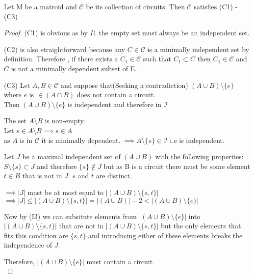 \documentclass[../main.tex]{subfiles}
\begin{document}
 \begin{thm}
 Let M be a matroid and $\mathcal{C}$ be its collection of circuits. Then $\mathcal{C}$ satisfies (C1) - (C3)
  \end{thm}
\begin{proof}
\noindent (C1) is obvious as by $I1$ the empty set must always be an independent set.
 
\noindent (C2) is also straightforward because any $ C \in \mathcal{C} $ is a minimally independent set by definition. Therefore , if there exists a $ C_1 \in \mathcal{C} $ such that $ C_1 \subset C $ then $ C_1 \in \mathcal{C} $ and $ C $ is not a minimally dependent subset of E. 
 
 \vspace{2mm}
 
 \noindent (C3) Let $ A, B \in \mathcal{C} $ and suppose that(Seeking a contradiction) $ (A \cup B) \setminus \{e\} $ where $ e $ is $ \in (A \cap B) $ does not contain a circuit.\\
 \noindent Then $ (A \cup B) \setminus \{e\} $ is independent and therefore in $\mathcal{I}$
 
 \vspace{2mm}
 
\noindent The set $ A \setminus B $ is non-empty.\\
 Let $ s \in A \setminus B    \implies s \in A$\\
 \noindent as $A$ is in $\mathcal{C}$ it is minimally dependent.
 \noindent $\implies A \setminus \{s\} \in \mathcal{I}$ i.e is independent.
 
 \vspace{2mm}
 
\noindent Let $J$ be a maximal independent set of $(A \cup B)$ with the following properties: $S \setminus \{s\} \subset J $ and therefore $ \{s\} \notin J $ but as B is a circuit there must be some element $t \in B$ that is not in $J$. $s$ and $t$ are distinct.
 
 \vspace{2mm}
 
\noindent $\implies |J| $ must be at most equal to $|(A \cup B) \setminus \{s,t\}| $\\
 $\implies |J| \leq |(A \cup B) \setminus \{s,t\}| = |(A \cup B)| - 2 < |(A \cup B) \setminus \{e\}|$
 
 \vspace{2mm} 
 
 \noindent Now by (I3) we can subsitute elements from $|(A \cup B) \setminus \{e\}|$ into $|(A \cup B) \setminus \{s,t\}|$ that are not in $|(A \cup B) \setminus \{s,t\}|$ but the only elements that fits this condition are $\{s,t\}$ and introducing either of these elements breaks the independence of $J$.
 
\noindent Therefore, $|(A \cup B) \setminus \{e\}|$ must contain a circuit\\
 \end{proof}
 
\end{document}

